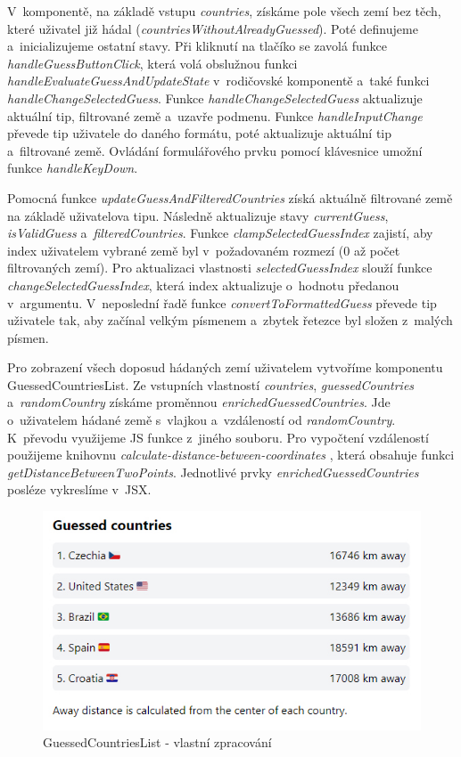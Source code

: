V~komponentě, na základě vstupu \emph{countries}, získáme pole všech zemí bez těch, které uživatel již hádal (\emph{countriesWithoutAlreadyGuessed}). Poté definujeme a~inicializujeme ostatní stavy. 
Při kliknutí na tlačíko se zavolá funkce \emph{handleGuessButtonClick}, která volá obslužnou funkci \emph{handleEvaluateGuessAndUpdateState} v~rodičovské komponentě a~také funkci \emph{handleChangeSelectedGuess}. 
Funkce \emph{handleChangeSelectedGuess} aktualizuje aktuální tip, filtrované země a~uzavře podmenu. Funkce \emph{handleInputChange} převede tip uživatele do daného formátu, poté aktualizuje aktuální tip a~filtrované země. 
Ovládání formulářového prvku pomocí klávesnice umožní funkce \emph{handleKeyDown}.

Pomocná funkce \emph{updateGuessAndFilteredCountries} získá aktuálně filtrované země na základě uživatelova tipu. Následně aktualizuje stavy \emph{currentGuess}, \emph{isValidGuess} a~\emph{filteredCountries}. 
Funkce \emph{clampSelectedGuessIndex} zajistí, aby index uživatelem vybrané země byl v~požadovaném rozmezí (0 až počet filtrovaných zemí). 
Pro aktualizaci vlastnosti \emph{selectedGuessIndex} slouží funkce \emph{changeSelectedGuessIndex}, která index aktualizuje o~hodnotu předanou v~argumentu.
V~neposlední řadě funkce \emph{convertToFormattedGuess} převede tip uživatele tak, aby začínal velkým písmenem a~zbytek řetezce byl složen z~malých písmen.

Pro zobrazení všech doposud hádaných zemí uživatelem vytvoříme komponentu GuessedCountriesList. Ze vstupních vlastností \emph{countries}, \emph{guessedCountries} a~\emph{randomCountry} získáme proměnnou \emph{enrichedGuessedCountries}. 
Jde o~uživatelem hádané země s~vlajkou a~vzdáleností od \emph{randomCountry}. K~převodu využijeme JS funkce z~jiného souboru. 
Pro vypočtení vzdáleností použijeme knihovnu \emph{calculate-distance-between-coordinates} \cite{distancebetweencoordinates}, která obsahuje funkci \emph{getDistanceBetweenTwoPoints}. 
Jednotlivé prvky \emph{enrichedGuessedCountries} posléze vykreslíme v~JSX.

\begin{figure}[htb]
	\centering
		\includegraphics[width=.7\textwidth]{images/GuessedCountriesList.jpg}
	\caption[GuessedCountriesList]{GuessedCountriesList - vlastní zpracování}
	\label{fig:reactguessedcountrieslist}
\end{figure}

